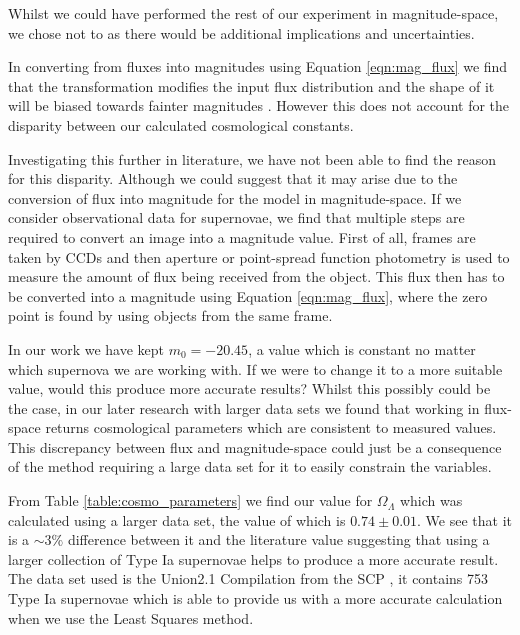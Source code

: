 \documentclass[twocolumn]{revtex4}
\begin{document}
Whilst we could have performed the rest of our experiment in magnitude-space, we chose not to as there would be additional implications and uncertainties.

In converting from fluxes into magnitudes using Equation \ref{eqn:mag_flux} we find that the transformation modifies the input flux distribution and the shape of it will be biased towards fainter magnitudes \cite{magspace_stats}. However this does not account for the disparity between our calculated cosmological constants. 

Investigating this further in literature, we have not been able to find the reason for this disparity. Although we could suggest that it may arise due to the conversion of flux into magnitude for the model in magnitude-space. If we consider observational data for supernovae, we find that multiple steps are required to convert an image into a magnitude value. First of all, frames are taken by CCDs and then aperture or point-spread function photometry is used to measure the amount of flux being received from the object. This flux then has to be converted into a magnitude using Equation \ref{eqn:mag_flux}, where the zero point is found by using objects from the same frame. 


In our work we have kept $m_0=-20.45$, a value which is constant no matter which supernova we are working with. If we were to change it to a more suitable value, would this produce more accurate results? Whilst this possibly could be the case, in our later research with larger data sets we found that working in flux-space returns cosmological parameters which are consistent to measured values. This discrepancy between flux and magnitude-space could just be a consequence of the method requiring a large data set for it to easily constrain the variables.

From Table \ref{table:cosmo_parameters} we find our value for $\Omega_\Lambda$ which was calculated using a larger data set, the value of which is $0.74\pm0.01$. We see that it is a $\sim 3\%$ difference between it and the literature value suggesting that using a larger collection of Type Ia supernovae helps to produce a more accurate result. The data set used is the Union2.1 Compilation from the SCP \cite{dataset_2}, it contains 753 Type Ia supernovae which is able to provide us with a more accurate calculation when we use the Least Squares method.
\end{document}

